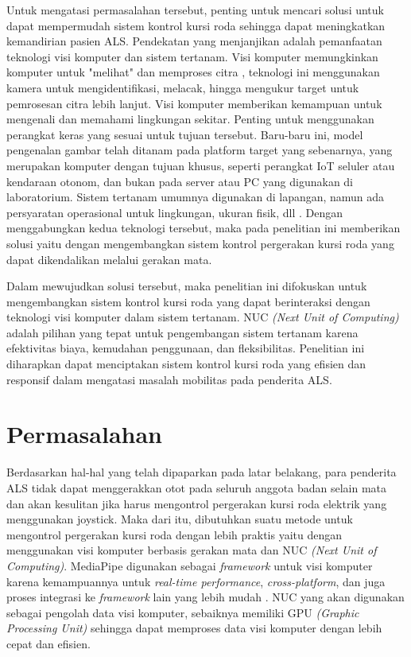 Untuk mengatasi permasalahan tersebut, penting untuk mencari solusi untuk dapat mempermudah sistem kontrol kursi roda sehingga dapat meningkatkan kemandirian pasien ALS. Pendekatan yang menjanjikan adalah pemanfaatan teknologi visi komputer dan sistem tertanam. Visi komputer memungkinkan komputer untuk "melihat" dan memproses citra \parencite{TIAN20201}, teknologi ini menggunakan kamera untuk mengidentifikasi, melacak, hingga mengukur target untuk pemrosesan citra lebih lanjut. Visi komputer memberikan kemampuan untuk mengenali dan memahami lingkungan sekitar. Penting untuk menggunakan perangkat keras yang sesuai untuk tujuan tersebut. Baru-baru ini, model pengenalan gambar telah ditanam pada platform target yang sebenarnya, yang merupakan komputer dengan tujuan khusus, seperti perangkat IoT seluler atau kendaraan otonom, dan bukan pada server atau PC yang digunakan di laboratorium. Sistem tertanam umumnya digunakan di lapangan, namun ada persyaratan operasional untuk lingkungan, ukuran fisik, dll \parencite{8939843}. Dengan menggabungkan kedua teknologi tersebut, maka pada penelitian ini memberikan solusi yaitu dengan mengembangkan sistem kontrol pergerakan kursi roda yang dapat dikendalikan melalui gerakan mata.

Dalam mewujudkan solusi tersebut, maka penelitian ini difokuskan untuk mengembangkan sistem kontrol kursi roda yang dapat berinteraksi dengan teknologi visi komputer dalam sistem tertanam. NUC \textit{(Next Unit of Computing)} adalah pilihan yang tepat untuk pengembangan sistem tertanam karena efektivitas biaya, kemudahan penggunaan, dan fleksibilitas. Penelitian ini diharapkan dapat menciptakan sistem kontrol kursi roda yang efisien dan responsif dalam mengatasi masalah mobilitas pada penderita ALS.

\section{Permasalahan}
\label{sec:permasalahan}

Berdasarkan hal-hal yang telah dipaparkan pada latar belakang, para penderita ALS tidak dapat menggerakkan otot pada seluruh anggota badan selain mata dan akan kesulitan jika harus mengontrol pergerakan kursi roda elektrik yang menggunakan joystick. Maka dari itu, dibutuhkan suatu metode untuk mengontrol pergerakan kursi roda dengan lebih praktis yaitu dengan menggunakan visi komputer berbasis gerakan mata dan NUC \textit{(Next Unit of Computing)}. MediaPipe digunakan sebagai \textit{framework} untuk visi komputer karena kemampuannya untuk \textit{real-time performance}, \textit{cross-platform}, dan juga proses integrasi ke \textit{framework} lain yang lebih mudah \parencite{lugaresi2019mediapipe}. NUC yang akan digunakan sebagai pengolah data visi komputer, sebaiknya memiliki GPU \textit{(Graphic Processing Unit)} sehingga dapat memproses data visi komputer dengan lebih cepat dan efisien.

